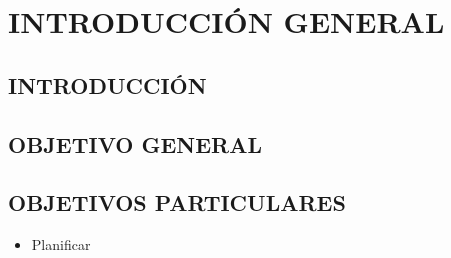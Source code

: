 \chapter{INTRODUCCIÓN GENERAL}
\section{INTRODUCCIÓN}

\Blindtext


\section{OBJETIVO GENERAL}
\blindtext
\section{OBJETIVOS PARTICULARES}

\begin{itemize}
	\item Planificar 
\end{itemize}